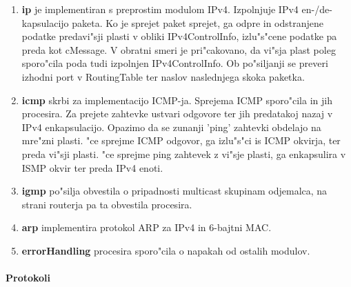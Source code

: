 \documentclass[a4paper,11pt]{article}
\begin{document}
\begin{enumerate}
    \item \textbf{ip} je implementiran s preprostim modulom IPv4. Izpolnjuje IPv4 en-/de-kapsulacijo paketa. Ko je sprejet paket sprejet, ga odpre in odstranjene podatke predavi"sji plasti v obliki IPv4ControlInfo, izlu"s"cene podatke pa preda kot cMessage. V obratni smeri je pri"cakovano, da vi"sja plast poleg sporo"cila poda tudi izpolnjen IPv4ControlInfo. Ob po"siljanji se preveri izhodni port v RoutingTable ter naslov naslednjega skoka paketka.

    \item \textbf{icmp} skrbi za implementacijo ICMP-ja. Sprejema ICMP sporo"cila in jih procesira. Za prejete zahtevke ustvari odgovore ter jih predatakoj nazaj v IPv4 enkapsulacijo. Opazimo da se zunanji 'ping' zahtevki obdelajo na mre"zni plasti. "ce sprejme ICMP odgovor, ga izlu"s"ci is ICMP okvirja, ter preda vi"sji plasti. "ce sprejme ping zahtevek z vi"sje plasti, ga enkapsulira v ISMP okvir ter preda IPv4 enoti.

    \item \textbf{igmp} po"silja obvestila o pripadnosti multicast skupinam odjemalca, na strani routerja pa ta obvestila procesira.

    \item \textbf{arp} implementira protokol ARP za IPv4 in 6-bajtni MAC.

    \item \textbf{errorHandling} procesira sporo"cila o napakah od ostalih modulov.

\end{enumerate}



\paragraph{Protokoli}
\label{description:Protokoli}
\end{document}
